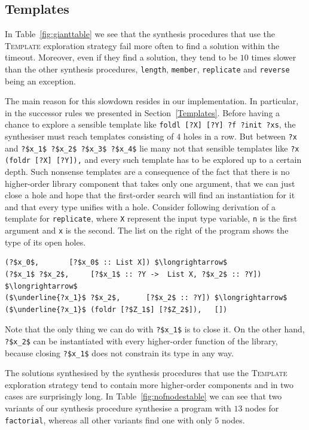 \subsection{Templates}
In Table~\ref{fig:gianttable} we see that the synthesis procedures that use the \textsc{Template} exploration strategy fail more often to find a solution within the timeout. Moreover, even if they find a solution, they tend to be $10$ times slower than the other synthesis procedures, \lstinline?length?, \lstinline?member?, \lstinline?replicate? and \lstinline?reverse? being an exception.

The main reason for this slowdown resides in our implementation. In particular, in the successor rules we presented in Section~\ref{Templates}. Before having a chance to explore a sensible template like \lstinline!foldl [?X] [?Y] ?f ?init ?xs!, the synthesiser must reach templates consisting of $4$ holes in a row. But between \lstinline!?x! and \lstinline!?$x_1$ ?$x_2$ ?$x_3$ ?$x_4$! lie many not that sensible templates like \lstinline!?x (foldr [?X] [?Y]),! and every such template has to be explored up to a certain depth.
Such nonsense templates are a consequence of the fact that there is no higher-order library component that takes only one argument, that we can just close a hole and hope that the first-order search will find an instantiation for it and that every type unifies with a hole.
Consider following derivation of a template for \lstinline?replicate?, where \lstinline?X? represent the input type variable, \lstinline?n? is the first argument and \lstinline?x? is the second. The list on the right of the program shows the type of its open holes.
\begin{lstlisting}[style=plain]
(?$x_0$,       [?$x_0$ :: List X]) $\longrightarrow$
(?$x_1$ ?$x_2$,     [?$x_1$ :: ?Y ->  List X, ?$x_2$ :: ?Y]) $\longrightarrow$
($\underline{?x_1}$ ?$x_2$,      [?$x_2$ :: ?Y]) $\longrightarrow$
($\underline{?x_1}$ (foldr [?$Z_1$] [?$Z_2$]),   [])
\end{lstlisting}
Note that the only thing we can do with \lstinline!?$x_1$! is to close it. On the other hand, \lstinline!?$x_2$! can be instantiated with every higher-order function of the library, because closing \lstinline!?$x_1$! does not constrain its type in any way.

The solutions synthesised by the synthesis procedures that use the \textsc{Template} exploration strategy tend to contain more higher-order components and in two cases are surprisingly long. In Table~\ref{fig:nofnodestable} we can see that two variants of our synthesis procedure synthesise a program with $13$ nodes for \lstinline?factorial?, whereas all other variants find one with only $5$ nodes.

